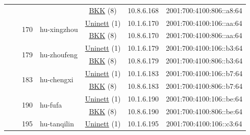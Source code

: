 \begin{small}
\begin{center}
\begin{longtable}{|c|c|c|c|c|c|c|c|}
  &  &  &  & \multicolumn{2}{|c|}{\tiny{\href{http://bkk.no}{BKK} (8)}} & \tiny{10.8.6.168} & \tiny{2001:700:4100:806::a8:64} \\* \cline{3-3}\cline{4-4}\cline{5-5}\cline{6-6}\cline{7-7}\cline{8-8}
  &  & \multirow{2}{*}{\tiny{170}} & \multicolumn{1}{|l|}{\multirow{2}{*}{\tiny{hu-xingzhou}}} & \multicolumn{2}{|c|}{\tiny{\href{https://www.uninett.no}{Uninett} (1)}} & \tiny{10.1.6.170} & \tiny{2001:700:4100:106::aa:64} \\* \cline{5-5}\cline{6-6}\cline{7-7}\cline{8-8}
  &  &  &  & \multicolumn{2}{|c|}{\tiny{\href{http://bkk.no}{BKK} (8)}} & \tiny{10.8.6.170} & \tiny{2001:700:4100:806::aa:64} \\* \cline{3-3}\cline{4-4}\cline{5-5}\cline{6-6}\cline{7-7}\cline{8-8}
  &  & \multirow{2}{*}{\tiny{179}} & \multicolumn{1}{|l|}{\multirow{2}{*}{\tiny{hu-zhoufeng}}} & \multicolumn{2}{|c|}{\tiny{\href{https://www.uninett.no}{Uninett} (1)}} & \tiny{10.1.6.179} & \tiny{2001:700:4100:106::b3:64} \\* \cline{5-5}\cline{6-6}\cline{7-7}\cline{8-8}
  &  &  &  & \multicolumn{2}{|c|}{\tiny{\href{http://bkk.no}{BKK} (8)}} & \tiny{10.8.6.179} & \tiny{2001:700:4100:806::b3:64} \\* \cline{3-3}\cline{4-4}\cline{5-5}\cline{6-6}\cline{7-7}\cline{8-8}
  &  & \multirow{2}{*}{\tiny{183}} & \multicolumn{1}{|l|}{\multirow{2}{*}{\tiny{hu-chengxi}}} & \multicolumn{2}{|c|}{\tiny{\href{https://www.uninett.no}{Uninett} (1)}} & \tiny{10.1.6.183} & \tiny{2001:700:4100:106::b7:64} \\* \cline{5-5}\cline{6-6}\cline{7-7}\cline{8-8}
  &  &  &  & \multicolumn{2}{|c|}{\tiny{\href{http://bkk.no}{BKK} (8)}} & \tiny{10.8.6.183} & \tiny{2001:700:4100:806::b7:64} \\* \cline{3-3}\cline{4-4}\cline{5-5}\cline{6-6}\cline{7-7}\cline{8-8}
  &  & \multirow{2}{*}{\tiny{190}} & \multicolumn{1}{|l|}{\multirow{2}{*}{\tiny{hu-fufa}}} & \multicolumn{2}{|c|}{\tiny{\href{https://www.uninett.no}{Uninett} (1)}} & \tiny{10.1.6.190} & \tiny{2001:700:4100:106::be:64} \\* \cline{5-5}\cline{6-6}\cline{7-7}\cline{8-8}
  &  &  &  & \multicolumn{2}{|c|}{\tiny{\href{http://bkk.no}{BKK} (8)}} & \tiny{10.8.6.190} & \tiny{2001:700:4100:806::be:64} \\* \cline{3-3}\cline{4-4}\cline{5-5}\cline{6-6}\cline{7-7}\cline{8-8}
  &  & \multirow{2}{*}{\tiny{195}} & \multicolumn{1}{|l|}{\multirow{2}{*}{\tiny{hu-tanqilin}}} & \multicolumn{2}{|c|}{\tiny{\href{https://www.uninett.no}{Uninett} (1)}} & \tiny{10.1.6.195} & \tiny{2001:700:4100:106::c3:64} \\* \cline{5-5}\cline{6-6}\cline{7-7}\cline{8-8}

\end{longtable}
\end{center}
\end{small}
